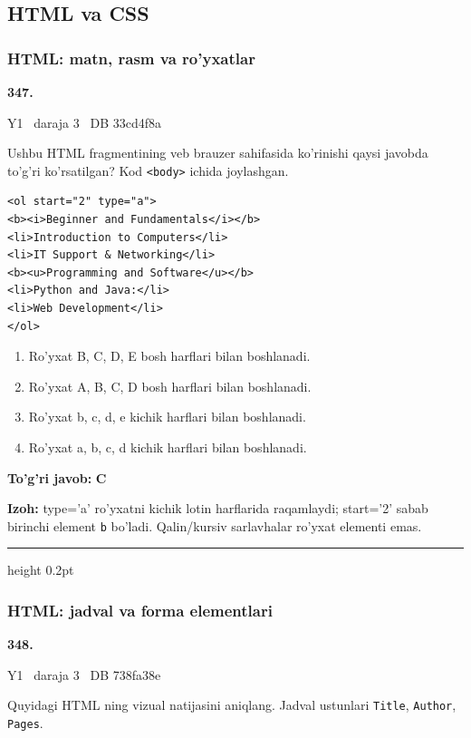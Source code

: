\documentclass[10pt,a4paper,oneside]{article}
\begin{document}
\subsection{HTML va CSS}
\subsubsection{HTML: matn, rasm va ro'yxatlar}
\hypertarget{q347}{\textbf{\color{ink}347.}}  {\color{muted}\scriptsize Y1 \textbullet\ daraja 3 \textbullet\ DB 33cd4f8a}
\par
Ushbu HTML fragmentining veb brauzer sahifasida ko'rinishi qaysi javobda to'g'ri ko'rsatilgan? Kod \texttt{\textless{}body\textgreater{}} ichida joylashgan.

\par
\begin{lstlisting}
<ol start="2" type="a">
<b><i>Beginner and Fundamentals</i></b>
<li>Introduction to Computers</li>
<li>IT Support & Networking</li>
<b><u>Programming and Software</u></b>
<li>Python and Java:</li>
<li>Web Development</li>
</ol>
\end{lstlisting}

\begin{enumerate}[label=\Alph*),leftmargin=9mm]
\item Ro'yxat B, C, D, E bosh harflari bilan boshlanadi.
\item Ro'yxat A, B, C, D bosh harflari bilan boshlanadi.
\item Ro'yxat b, c, d, e kichik harflari bilan boshlanadi.
\item Ro'yxat a, b, c, d kichik harflari bilan boshlanadi.
\end{enumerate}
\begin{tcolorbox}[enhanced,breakable,colback=teal!4,colframe=teal!45!black,boxrule=0.45pt,arc=1.2mm,left=2.8mm,right=2.8mm,top=2mm,bottom=2mm,before skip=2mm,after skip=2mm]
\textbf{\color{teal}To'g'ri javob:} \textbf{C}
\par\smallskip
\textbf{Izoh:} type='a' ro'yxatni kichik lotin harflarida raqamlaydi; start='2' sabab birinchi element \texttt{b} bo'ladi. Qalin/kursiv sarlavhalar ro'yxat elementi emas.
\end{tcolorbox}
\vspace{2mm}\hrule height 0.2pt \vspace{4mm}
\subsubsection{HTML: jadval va forma elementlari}
\hypertarget{q348}{\textbf{\color{ink}348.}}  {\color{muted}\scriptsize Y1 \textbullet\ daraja 3 \textbullet\ DB 738fa38e}
\par
Quyidagi HTML ning vizual natijasini aniqlang. Jadval ustunlari \texttt{Title}, \texttt{Author}, \texttt{Pages}.
\end{document}

